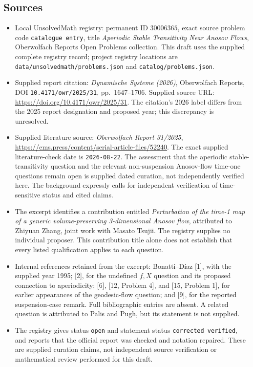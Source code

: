 \documentclass[11pt]{article}
\begin{document}
\subsection{Sources}
\begin{itemize}
\item Local UnsolvedMath registry: permanent ID \(30006365\), exact source problem code \texttt{catalogue entry}, title \emph{Aperiodic Stable Transitivity Near Anosov Flows}, Oberwolfach Reports Open Problems collection. This draft uses the supplied complete registry record; project registry locations are \texttt{data/unsolvedmath/problems.json} and \texttt{catalog/problems.json}.
\item Supplied report citation: \emph{Dynamische Systeme (2026)}, Oberwolfach Reports, DOI \texttt{10.4171/owr/2025/31}, pp.\ 1647--1706. Supplied source URL: \url{https://doi.org/10.4171/owr/2025/31}. The citation's 2026 label differs from the 2025 report designation and proposed year; this discrepancy is unresolved.
\item Supplied literature source: \emph{Oberwolfach Report 31/2025}, \url{https://ems.press/content/serial-article-files/52240}. The exact supplied literature-check date is \texttt{2026-08-22}. The assessment that the aperiodic stable-transitivity question and the relevant non-suspension Anosov-flow time-one questions remain open is supplied dated curation, not independently verified here. The background expressly calls for independent verification of time-sensitive status and cited claims.
\item The excerpt identifies a contribution entitled \emph{Perturbation of the time-1 map of a generic volume-preserving 3-dimensional Anosov flow}, attributed to Zhiyuan Zhang, joint work with Masato Tsujii. The registry supplies no individual proposer. This contribution title alone does not establish that every listed qualification applies to each question.
\item Internal references retained from the excerpt: Bonatti--D\'iaz [1], with the supplied year 1995; [2], for the undefined \(f,X\) question and its proposed connection to aperiodicity; [6], [12, Problem 4], and [15, Problem 1], for earlier appearances of the geodesic-flow question; and [9], for the reported suspension-case remark. Full bibliographic entries are absent. A related question is attributed to Palis and Pugh, but its statement is not supplied.
\item The registry gives status \texttt{open} and statement status \texttt{corrected\_verified}, and reports that the official report was checked and notation repaired. These are supplied curation claims, not independent source verification or mathematical review performed for this draft.
\end{itemize}
\end{document}
